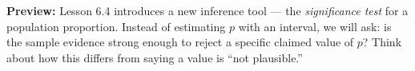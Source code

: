 \documentclass[10pt]{article}
\begin{document}
\begin{reflectionbox}
\textbf{Preview:} Lesson 6.4 introduces a new inference tool --- the \emph{significance test} for
a population proportion. Instead of estimating $p$ with an interval, we will ask: is the sample
evidence strong enough to reject a specific claimed value of $p$? Think about how this differs
from saying a value is ``not plausible.''
\end{reflectionbox}
\end{document}
